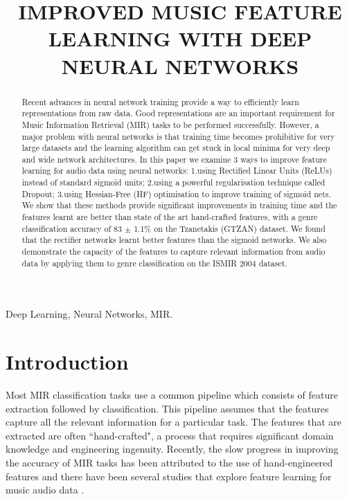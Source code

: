 \documentclass{article}
\title{IMPROVED MUSIC FEATURE LEARNING WITH DEEP NEURAL NETWORKS}
\begin{document}
%
\maketitle
%
\begin{abstract}
Recent advances in neural network training provide a way to efficiently learn representations from raw data. Good representations are an important requirement for Music Information Retrieval (MIR) tasks to be performed successfully. However, a major problem with neural networks is that training time becomes prohibitive for very large datasets and the learning algorithm can get stuck in local minima for very deep and wide network architectures. In this paper we examine 3 ways to improve feature learning for audio data using neural networks: 1.using Rectified Linear Units (ReLUs) instead of standard sigmoid units; 2.using a powerful regularisation technique called Dropout; 3.using Hessian-Free (HF) optimisation to improve training of sigmoid nets. We show that these methods provide significant improvements in training time and the features learnt are better than state of the art hand-crafted features, with a genre classification accuracy of 83 $\pm$ 1.1\% on the Tzanetakis (GTZAN) dataset. We found that the rectifier networks learnt better features than the sigmoid networks. We also demonstrate the capacity of the features to capture relevant information from audio data by applying them to genre classification on the ISMIR 2004 dataset. 

\end{abstract}
%
\begin{keywords}
Deep Learning, Neural Networks, MIR. 
\end{keywords}
%
\section{Introduction}
\label{sec:intro} 

Most MIR classification tasks use a common pipeline which consists of feature extraction followed by classification. This pipeline assumes that the features capture all the relevant information for a particular task. The features that are extracted are often ``hand-crafted", a process that requires significant domain knowledge and engineering ingenuity. Recently, the slow progress in improving the accuracy of MIR tasks has been attributed to the use of hand-engineered features \cite{humphrey2013feature} and there have been several studies that explore feature learning for music audio data \cite{lee2009convolutional,hamel2010learning,henaff2011unsupervised}. 
\end{document}
